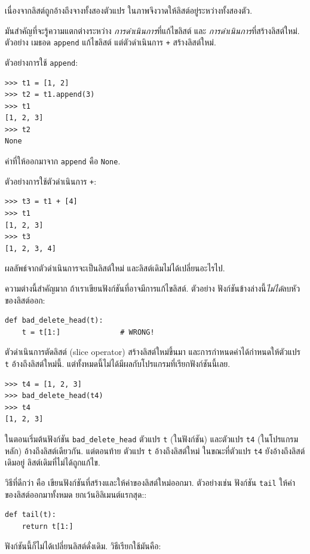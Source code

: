 เนื่องจากลิสต์ถูกอ้างถึงจางทั้งสองตัวแปร ในภาพจึงวาดให้ลิสต์อยู่ระหว่างทั้งสองตัว.

มันสำคัญที่จะรู้ความแตกต่างระหว่าง
\textit{การดำเนินการ}ที่แก้ไขลิสต์
และ
\textit{การดำเนินการ}ที่สร้างลิสต์ใหม่.
ตัวอย่าง เมธอด \texttt{append} แก้ไขลิสต์
แต่ตัวดำเนินการ \texttt{+} สร้างลิสต์ใหม่.

ตัวอย่างการใช้ \texttt{append}:
%
\begin{verbatim}
>>> t1 = [1, 2]
>>> t2 = t1.append(3)
>>> t1
[1, 2, 3]
>>> t2
None
\end{verbatim}
%
ค่าที่ให้ออกมาจาก \texttt{append} คือ \texttt{None}.

ตัวอย่างการใช้ตัวดำเนินการ \texttt{+}:
%
\begin{verbatim}
>>> t3 = t1 + [4]
>>> t1
[1, 2, 3]
>>> t3
[1, 2, 3, 4]
\end{verbatim}
%
ผลลัพธ์จากตัวดำเนินการจะเป็นลิสต์ใหม่
และลิสต์เดิมไม่ได้เปลี่ยนอะไรไป.

ความต่างนี้สำคัญมาก ถ้าเราเขียนฟังก์ชันที่อาจมีการแก้ไขลิสต์.
ตัวอย่าง ฟังก์ชันข้างล่างนี้\emph{ไม่ได้}ลบหัวของลิสต์ออก:
%
\begin{verbatim}
def bad_delete_head(t):
    t = t[1:]              # WRONG!
\end{verbatim}
%
ตัวดำเนินการตัดลิสต์ (slice operator) สร้างลิสต์ใหม่ขึ้นมา
และการกำหนดค่าได้กำหนดให้ตัวแปร \texttt{t} อ้างถึงลิสต์ใหม่นี้.
แต่ทั้งหมดนี้ไม่ได้มีผลกับโปรแกรมที่เรียกฟังก์ชันนี้เลย.
%
\begin{verbatim}
>>> t4 = [1, 2, 3]
>>> bad_delete_head(t4)
>>> t4
[1, 2, 3]
\end{verbatim}
%
ในตอนเริ่มต้นฟังก์ชัน \verb|bad_delete_head| ตัวแปร \texttt{t} (ในฟังก์ชัน) และตัวแปร \texttt{t4} (ในโปรแกรมหลัก) อ้างถึงลิสต์เดียวกัน.
แต่ตอนท้าย ตัวแปร \texttt{\tt t} อ้างถึงลิสต์ใหม่
ในขณะที่ตัวแปร \texttt{t4} ยังอ้างถึงลิสต์เดิมอยู่ ลิสต์เดิมที่ไม่ได้ถูกแก้ไข.

วิธีที่ดีกว่า คือ เขียนฟังก์ชันที่สร้างและให้ค่าของลิสต์ใหม่ออกมา.
ตัวอย่างเช่น ฟังก์ชัน \texttt{tail} ให้ค่าของลิสต์ออกมาทั้งหมด ยกเว้นอิลิเมนต์แรกสุด::

\begin{verbatim}
def tail(t):
    return t[1:]
\end{verbatim}
%
ฟังก์ชันนี้ก็ไม่ได้เปลี่ยนลิสต์ดั่งเดิม.
วิธีเรียกใช้มันคือ:

